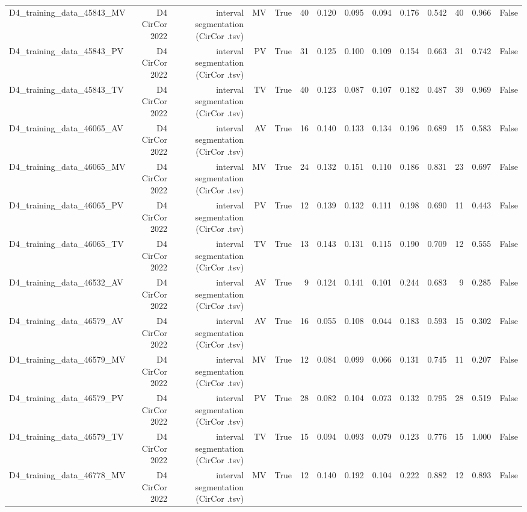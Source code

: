 \begin{table}[htbp]
\begin{tabular}{lrrrrrrrrrrrrr}
    D4\_training\_data\_45843\_MV & D4 CirCor 2022 & interval segmentation (CirCor .tsv) & MV & True & 40 & 0.120 & 0.095 & 0.094 & 0.176 & 0.542 & 40 & 0.966 & False \\
    D4\_training\_data\_45843\_PV & D4 CirCor 2022 & interval segmentation (CirCor .tsv) & PV & True & 31 & 0.125 & 0.100 & 0.109 & 0.154 & 0.663 & 31 & 0.742 & False \\
    D4\_training\_data\_45843\_TV & D4 CirCor 2022 & interval segmentation (CirCor .tsv) & TV & True & 40 & 0.123 & 0.087 & 0.107 & 0.182 & 0.487 & 39 & 0.969 & False \\
    D4\_training\_data\_46065\_AV & D4 CirCor 2022 & interval segmentation (CirCor .tsv) & AV & True & 16 & 0.140 & 0.133 & 0.134 & 0.196 & 0.689 & 15 & 0.583 & False \\
    D4\_training\_data\_46065\_MV & D4 CirCor 2022 & interval segmentation (CirCor .tsv) & MV & True & 24 & 0.132 & 0.151 & 0.110 & 0.186 & 0.831 & 23 & 0.697 & False \\
    D4\_training\_data\_46065\_PV & D4 CirCor 2022 & interval segmentation (CirCor .tsv) & PV & True & 12 & 0.139 & 0.132 & 0.111 & 0.198 & 0.690 & 11 & 0.443 & False \\
    D4\_training\_data\_46065\_TV & D4 CirCor 2022 & interval segmentation (CirCor .tsv) & TV & True & 13 & 0.143 & 0.131 & 0.115 & 0.190 & 0.709 & 12 & 0.555 & False \\
    D4\_training\_data\_46532\_AV & D4 CirCor 2022 & interval segmentation (CirCor .tsv) & AV & True & 9 & 0.124 & 0.141 & 0.101 & 0.244 & 0.683 & 9 & 0.285 & False \\
    D4\_training\_data\_46579\_AV & D4 CirCor 2022 & interval segmentation (CirCor .tsv) & AV & True & 16 & 0.055 & 0.108 & 0.044 & 0.183 & 0.593 & 15 & 0.302 & False \\
    D4\_training\_data\_46579\_MV & D4 CirCor 2022 & interval segmentation (CirCor .tsv) & MV & True & 12 & 0.084 & 0.099 & 0.066 & 0.131 & 0.745 & 11 & 0.207 & False \\
    D4\_training\_data\_46579\_PV & D4 CirCor 2022 & interval segmentation (CirCor .tsv) & PV & True & 28 & 0.082 & 0.104 & 0.073 & 0.132 & 0.795 & 28 & 0.519 & False \\
    D4\_training\_data\_46579\_TV & D4 CirCor 2022 & interval segmentation (CirCor .tsv) & TV & True & 15 & 0.094 & 0.093 & 0.079 & 0.123 & 0.776 & 15 & 1.000 & False \\
    D4\_training\_data\_46778\_MV & D4 CirCor 2022 & interval segmentation (CirCor .tsv) & MV & True & 12 & 0.140 & 0.192 & 0.104 & 0.222 & 0.882 & 12 & 0.893 & False \\

\end{tabular}
\end{table}
